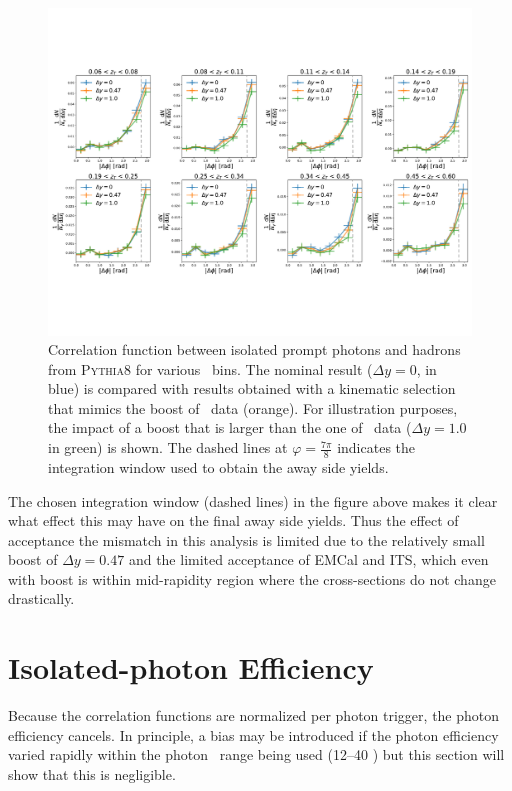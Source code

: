 \begin{figure}
\centering
\includegraphics[width = 1.0 \textwidth]{Checks_Systematics/PythiaStudyBoost_wLines}
\caption{Correlation function between isolated prompt photons and hadrons from \textsc{Pythia8} for various \zt~bins. The nominal result ($\Delta y =0$, in blue) is compared with results obtained with a kinematic selection that mimics the boost of \pPb~data (orange). For illustration purposes, the impact of a boost that is larger than the one of \pPb~data ($\Delta y = 1.0$ in green) is shown. The dashed lines at $\varphi = \frac{7\pi}{8} $ indicates the integration window used to obtain the away side yields.}
\label{fig:PythiaBoostStudy}
\end{figure}

The chosen integration window (dashed lines) in the figure above makes it clear what effect this may have on the final away side yields. Thus the effect of acceptance the mismatch in this analysis is limited due to the relatively small boost of $\Delta y = 0.47$ and the limited acceptance of EMCal and ITS, which even with boost is within mid-rapidity region where the cross-sections do not change drastically. 

\label{sec:EfficiencyAppendix}
\section{Isolated-photon Efficiency}

Because the correlation functions are normalized per photon trigger, the photon efficiency cancels. In principle, a bias may be introduced if the photon efficiency varied rapidly within the photon \pt~range being used (12--40 \GeVc) but this section will show that this is negligible.  

